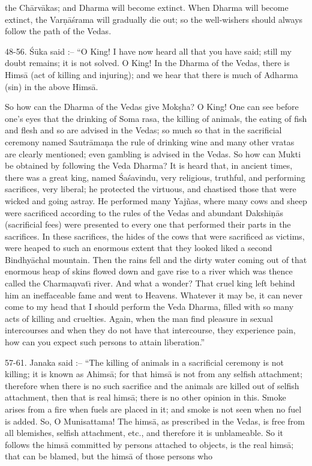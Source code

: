 the Ch\=arv\=akas; and Dharma will become extinct. When Dharma will become extinct, the Var\d{n}\=a\'srama will gradually die out; so the well-wishers should always follow the path of the Vedas.

48-56. \'S\=uka said :-- ``O King! I have now heard all that you have said; still my doubt remains; it is not solved. O King! In the Dharma of the Vedas, there is Hims\=a (act of killing and injuring); and we hear that there is much of Adharma (sin) in the above Hims\=a.

So how can the Dharma of the Vedas give Mok\d{s}ha? O King! One can see before one's eyes that the drinking of Soma rasa, the killing of animals, the eating of fish and flesh and so are advised in the Vedas; so much so that in the sacrificial ceremony named Sautr\=ama\d{n}a the rule of drinking wine and many other vratas are clearly mentioned; even gambling is advised in the Vedas. So how can Mukti be obtained by following the Veda Dharma? It is heard that, in ancient times, there was a great king, named \'Sa\'savindu, very religious, truthful, and performing sacrifices, very liberal; he protected the virtuous, and chastised those that were wicked and going astray. He performed many Yaj\~nas, where many cows and sheep were sacrificed according to the rules of the Vedas and abundant Dakshi\d{n}\=as (sacrificial fees) were presented to every one that performed their parts in the sacrifices. In these sacrifices, the hides of the cows that were sacrificed as victims, were heaped to such an enormous extent that they looked liked a second Bindhy\=achal mountain. Then the rains fell and the dirty water coming out of that enormous heap of skins flowed down and gave rise to a river which was thence called the Charma\d{n}vat\={\i} river. And what a wonder? That cruel king left behind him an ineffaceable fame and went to Heavens. Whatever it may be, it can never come to my head that I should perform the Veda Dharma, filled with so many acts of killing and cruelties. Again, when the man find pleasure in sexual intercourses and when they do not have that intercourse, they experience pain, how can you expect such persons to attain liberation.''

57-61. Janaka said :-- ``The killing of animals in a sacrificial ceremony is not killing; it is known as Ahims\=a; for that hims\=a is not from any selfish attachment; therefore when there is no such sacrifice and the animals are killed out of selfish attachment, then that is real hims\=a; there is no other opinion in this. Smoke arises from a fire when fuels are placed in it; and smoke is not seen when no fuel is added. So, O Munisattama! The hims\=a, as prescribed in the Vedas, is free from all blemishes, selfish attachment, etc., and therefore it is unblameable. So it follows the hims\=a committed by persons attached to objects, is the real hims\=a; that can be blamed, but the hims\=a of those persons who


